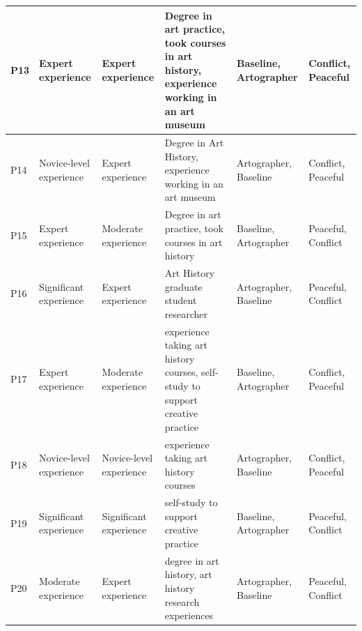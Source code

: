\documentclass[11pt]{article}
\begin{document}
\begin{table}[htbp]
{\begin{tabular}{p{0.5cm}p{3.2cm}p{3.2cm}p{3.5cm}p{2.0cm}p{1.8cm}}
\hline
P13 & Expert experience & Expert experience & Degree in art practice, took courses in art history, experience working in an art museum & Baseline, Artographer & Conflict, Peaceful \\
\hline
P14 & Novice-level experience & Expert experience & Degree in Art History, experience working in an art museum & Artographer, Baseline & Conflict, Peaceful \\
\hline
P15 & Expert experience & Moderate experience & Degree in art practice, took courses in art history & Baseline, Artographer & Peaceful, Conflict \\
\hline
P16 & Significant experience & Expert experience & Art History graduate student researcher & Artographer, Baseline & Peaceful, Conflict \\
\hline
P17 & Expert experience & Moderate experience & experience taking art history courses, self-study to support creative practice & Baseline, Artographer & Conflict, Peaceful \\
\hline
P18 & Novice-level experience & Novice-level experience & experience taking art history courses & Artographer, Baseline & Conflict, Peaceful \\
\hline
P19 & Significant experience & Significant experience & self-study to support creative practice & Baseline, Artographer & Peaceful, Conflict \\
\hline
P20 & Moderate experience & Expert experience & degree in art history, art history research experiences & Artographer, Baseline & Peaceful, Conflict \\
\hline
\end{tabular}
}
\end{table}
\end{document}
